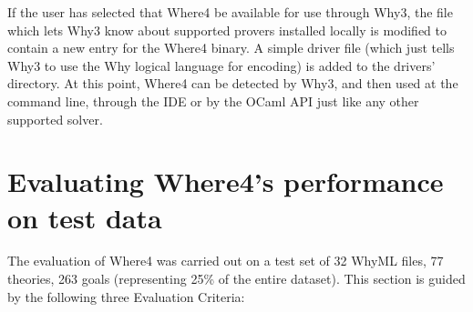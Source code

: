\documentclass[submission,copyright,creativecommons]{eptcs}
\begin{document}
If the user has selected that \textsf{Where4} be available for use through \textsf{Why3}, the file which lets \textsf{Why3} know about supported provers installed locally is modified to contain a new entry for the \textsf{Where4} binary. A simple driver file (which just tells \textsf{Why3} to use the Why logical language for encoding) is added to the drivers' directory. At this point, \textsf{Where4} can be detected by \textsf{Why3}, and then used at the command line, through the IDE or by the OCaml API just like any other supported solver. 

\section{Evaluating \textsf{Where4}'s performance on test data}
\label{sec:eval}



The evaluation of \textsf{Where4} was carried out on a test set of 32 WhyML files, 77 theories, 263 goals (representing 25\% of the entire dataset). This section is guided by the following three Evaluation Criteria:
\end{document}
